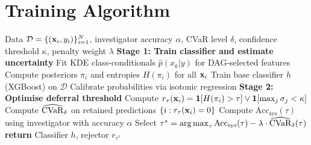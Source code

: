 \section{Training Algorithm}
\label{app:algorithm}

\begin{algorithm}[H]
    \caption{Safe-L2D-Fraud Training}
    \label{alg:training}
    \begin{algorithmic}[1]
        \REQUIRE Data $\mathcal{D} = \{(\mathbf{x}_i, y_i)\}_{i=1}^N$, investigator accuracy $\alpha$, CVaR level $\delta$, confidence threshold $\kappa$, penalty weight $\lambda$
        \STATE \textbf{Stage 1: Train classifier and estimate uncertainty}
        \STATE Fit KDE class-conditionals $\hat{p}(x_k | y)$ for DAG-selected features
        \STATE Compute posteriors $\pi_i$ and entropies $H(\pi_i)$ for all $\mathbf{x}_i$
        \STATE Train base classifier $h$ (XGBoost) on $\mathcal{D}$
        \STATE Calibrate probabilities via isotonic regression
        \STATE \textbf{Stage 2: Optimise deferral threshold}
            \STATE Compute $r_\tau(\mathbf{x}_i) = \mathbf{1}[H(\pi_i) > \tau] \lor \mathbf{1}[\max_j \sigma_j < \kappa]$
            \STATE Compute $\widehat{\mathrm{CVaR}}_\delta$ on retained predictions $\{i : r_\tau(\mathbf{x}_i) = 0\}$
            \STATE Compute $\text{Acc}_{\text{sys}}(\tau)$ using investigator with accuracy $\alpha$
        \ENDFOR
        \STATE Select $\tau^* = \operatorname*{arg\,max}_\tau \text{Acc}_{\text{sys}}(\tau) - \lambda \cdot \widehat{\mathrm{CVaR}}_\delta(\tau)$
        \STATE \textbf{return} Classifier $h$, rejector $r_{\tau^*}$
    \end{algorithmic}
\end{algorithm}
